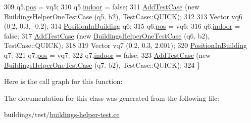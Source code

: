 \begin{DoxyCode}
309   q5.\hyperlink{structPositionInBuilding_a41887f00f92dbe21cdede9467303a82c}{pos} = vq5;
310   q5.\hyperlink{structPositionInBuilding_a3326a8e049a209ba1a54e79ea5e942ac}{indoor} = \textcolor{keyword}{false};
311   \hyperlink{classns3_1_1TestCase_a3718088e3eefd5d6454569d2e0ddd835}{AddTestCase} (\textcolor{keyword}{new} \hyperlink{classBuildingsHelperOneTestCase}{BuildingsHelperOneTestCase} (q5, b2), 
      TestCase::QUICK);
312 
313   Vector vq6 (0.2, 0.3, -0.2);
314   \hyperlink{structPositionInBuilding}{PositionInBuilding} q6;
315   q6.\hyperlink{structPositionInBuilding_a41887f00f92dbe21cdede9467303a82c}{pos} = vq6;
316   q6.\hyperlink{structPositionInBuilding_a3326a8e049a209ba1a54e79ea5e942ac}{indoor} = \textcolor{keyword}{false};
317   \hyperlink{classns3_1_1TestCase_a3718088e3eefd5d6454569d2e0ddd835}{AddTestCase} (\textcolor{keyword}{new} \hyperlink{classBuildingsHelperOneTestCase}{BuildingsHelperOneTestCase} (q6, b2), 
      TestCase::QUICK);
318 
319   Vector vq7 (0.2, 0.3, 2.001);
320   \hyperlink{structPositionInBuilding}{PositionInBuilding} q7;
321   q7.\hyperlink{structPositionInBuilding_a41887f00f92dbe21cdede9467303a82c}{pos} = vq7;
322   q7.\hyperlink{structPositionInBuilding_a3326a8e049a209ba1a54e79ea5e942ac}{indoor} = \textcolor{keyword}{false};
323   \hyperlink{classns3_1_1TestCase_a3718088e3eefd5d6454569d2e0ddd835}{AddTestCase} (\textcolor{keyword}{new} \hyperlink{classBuildingsHelperOneTestCase}{BuildingsHelperOneTestCase} (q7, b2), 
      TestCase::QUICK);     
324 \}
\end{DoxyCode}


Here is the call graph for this function\+:




The documentation for this class was generated from the following file\+:\begin{DoxyCompactItemize}
\item 
buildings/test/\hyperlink{buildings-helper-test_8cc}{buildings-\/helper-\/test.\+cc}\end{DoxyCompactItemize}
